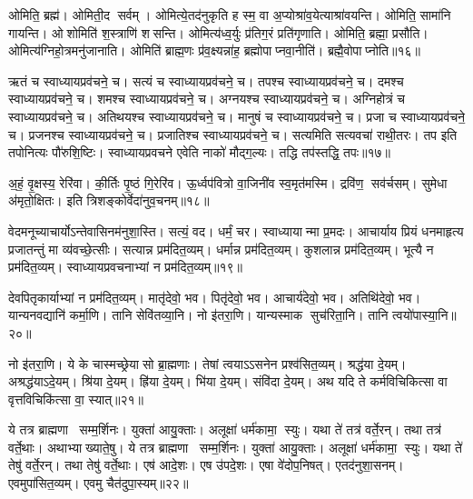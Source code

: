 ओमिति॒ ब्रह्म॑। ओमिती॒द सर्वम्। ओमित्ये॒तद॑नुकृति ह स्म॒ वा अ॒प्योश्रा॑व॒येत्याश्रा॑वयन्ति। ओमिति॒ सामा॑नि गायन्ति। ओशोमिति॑ श॒स्त्राणि॑ शसन्ति। ओमित्य॑ध्व॒र्युः प्र॑तिग॒रं प्रति॑गृणाति। ओमिति॒ ब्रह्मा॒ प्रसौ॑ति। ओमित्य॑ग्निहो॒त्रमनु॑जानाति। ओमिति॑ ब्राह्म॒णः प्र॑व॒क्ष्यन्ना॑ह॒ ब्रह्मोपाप्नवा॒नीति॑। ब्रह्मै॒वो\-पाप्नोति॥१६॥
\anuvakamend[ओन्दश॑]

ऋतं च स्वाध्यायप्रव॑चने॒ च। सत्यं च स्वाध्यायप्रव॑चने॒ च। तपश्च स्वाध्यायप्रव॑चने॒ च। दमश्च स्वाध्यायप्रव॑चने॒ च। शमश्च स्वाध्यायप्रव॑चने॒ च। अग्नयश्च स्वाध्यायप्रव॑चने॒ च। अग्निहोत्रं च स्वाध्यायप्रव॑चने॒ च। अतिथयश्च स्वाध्यायप्रव॑चने॒ च। मानुषं च स्वाध्यायप्रव॑चने॒ च। प्रजा च स्वाध्यायप्रव॑चने॒ च। प्रजनश्च स्वाध्यायप्रव॑चने॒ च। प्रजातिश्च स्वाध्यायप्रव॑चने॒ च। सत्यमिति सत्यवचा॑ राथी॒तरः। तप इति तपोनित्यः पौ॑रुशि॒ष्टिः। स्वाध्यायप्रवचने एवेति नाको॑ मौद्ग॒ल्यः। तद्धि तप॑स्तद्धि॒ तपः॥१७॥
\anuvakamend[प्रजा च स्वाध्यायप्रव॑चने॒ च षट्च॑]

अ॒हं॒ वृ॒क्षस्य॒ रेरि॑वा। की॒र्तिः पृ॒ष्ठं गि॒रेरि॑व। ऊ॒र्ध्वप॑वित्रो वा॒जिनी॑व स्व॒मृत॑मस्मि। द्रवि॑ण॒ सव॑र्चसम्। सुमेधा अ॑मृतो॒क्षितः। इति त्रिशङ्कोर्वेदा॑नुव॒चनम्॥१८॥
\anuvakamend[अ॒ह षट्]

वेदमनूच्याचार्योऽन्तेवासिनम॑नुशा॒स्ति। सत्यं॒ वद। धर्मं॒ चर। स्वाध्यायान्मा प्र॒मदः। आचार्याय प्रियं धनमाहृत्य प्रजातन्तुं मा व्य॑वच्छे॒त्सीः। सत्यान्न प्रम॑दित॒व्यम्। धर्मान्न प्रम॑दित॒व्यम्। कुशलान्न प्रम॑दित॒व्यम्। भूत्यै न प्रम॑दित॒व्यम्। स्वाध्यायप्रवचनाभ्यां न प्रम॑दित॒व्यम्॥१९॥

देवपितृकार्याभ्यां न प्रम॑दित॒व्यम्। मातृ॑देवो॒ भव। पितृ॑देवो॒ भव। आचार्य॑देवो॒ भव। अतिथि॑देवो॒ भव। यान्यनवद्यानि॑ कर्मा॒णि। तानि सेवि॑तव्या॒नि। नो इ॑तरा॒णि। यान्यस्माक सुच॑रिता॒नि। तानि त्वयो॑पास्या॒नि॥२०॥

नो इ॑तरा॒णि। ये के चास्मच्छ्रेयासो ब्रा॒ह्मणाः। तेषां त्वयाऽऽसनेन प्रश्व॑सित॒व्यम्। श्रद्ध॑या दे॒यम्। अश्रद्ध॑याऽदे॒यम्। श्रि॑या दे॒यम्। ह्रि॑या दे॒यम्। भि॑या दे॒यम्। संवि॑दा दे॒यम्। अथ यदि ते कर्मविचिकित्सा वा वृत्तविचिकि॑त्सा वा॒ स्यात्॥२१॥

ये तत्र ब्राह्मणा सम्म॒र्\mbox{}शिनः। युक्ता॑ आयु॒क्ताः। अलूक्षा॑ धर्म॑कामा॒ स्युः। यथा ते॑ तत्र॑ वर्ते॒रन्। तथा तत्र॑ वर्ते॒थाः। अथाभ्याख्याते॒षु। ये तत्र ब्राह्मणा सम्म॒र्\mbox{}शिनः। युक्ता॑ आयु॒क्ताः। अलूक्षा॑ धर्म॑कामा॒ स्युः। यथा ते॑ तेषु॑ वर्ते॒रन्। तथा तेषु॑ वर्ते॒थाः। एष॑ आदे॒शः। एष उ॑पदे॒शः। एषा वे॑दोप॒निषत्। एतद॑नुशा॒सनम्। एवमुपा॑सित॒व्यम्। एवमु चैत॑दुपा॒स्यम्॥२२॥
\anuvakamend[स्वाध्यायप्रवचनाभ्यान्न प्रम॑दित॒व्यं तानि त्वयो॑पास्या॒नि स्यात्तेषु॑ वर्ते॒रन्त्स॒प्त च॑]

